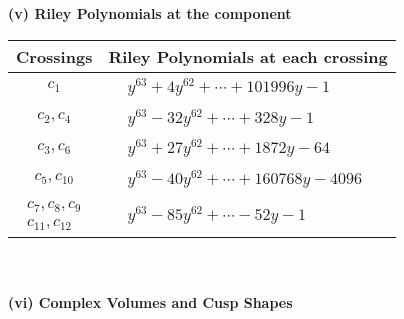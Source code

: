 \documentclass[1p]{elsarticle_modified}
\theoremstyle{definition}
\begin{document}
\newpage\renewcommand{\arraystretch}{1}
\flushleft \textbf{(v) Riley Polynomials at the component}\newline \\
\begin{tabular}{m{50pt}|m{274pt}}
Crossings & \hspace{64pt}Riley Polynomials at each crossing \\
\hline $$\begin{aligned}c_{1}\end{aligned}$$&$\begin{aligned}
&y^{63}+4 y^{62}+\cdots+101996 y-1
\end{aligned}$\\
\hline $$\begin{aligned}c_{2},c_{4}\end{aligned}$$&$\begin{aligned}
&y^{63}-32 y^{62}+\cdots+328 y-1
\end{aligned}$\\
\hline $$\begin{aligned}c_{3},c_{6}\end{aligned}$$&$\begin{aligned}
&y^{63}+27 y^{62}+\cdots+1872 y-64
\end{aligned}$\\
\hline $$\begin{aligned}c_{5},c_{10}\end{aligned}$$&$\begin{aligned}
&y^{63}-40 y^{62}+\cdots+160768 y-4096
\end{aligned}$\\
\hline $$\begin{aligned}c_{7},c_{8},c_{9}\\c_{11},c_{12}\end{aligned}$$&$\begin{aligned}
&y^{63}-85 y^{62}+\cdots-52 y-1
\end{aligned}$\\
\hline
\end{tabular}\\~\\
\newpage\flushleft \textbf{(vi) Complex Volumes and Cusp Shapes}
\end{document}
